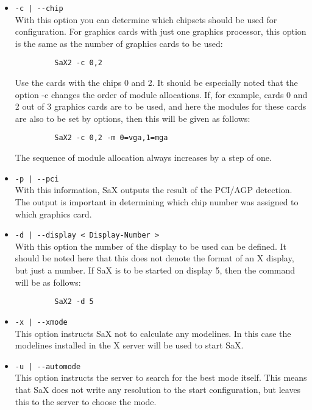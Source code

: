 \begin{itemize}
\item \verb+-c | --chip+\\
      With this option you can determine which chipsets should be used for
      configuration. For graphics cards with just one graphics processor,
      this option is the same as the number of graphics cards to be
      used:
      \begin{verbatim}
         SaX2 -c 0,2
      \end{verbatim}
      Use the cards with the chips 0 and 2. It should be especially noted that
      the option -c changes the order of module allocations. If, for example,
      cards 0 and 2 out of 3 graphics cards are to be used, and here the
      modules for these cards are also to be set by options, then this will be
      given as follows: 
      \begin{verbatim} 
         SaX2 -c 0,2 -m 0=vga,1=mga
      \end{verbatim}
      The sequence of module allocation always increases by a step of one.

\item \verb+-p | --pci+\\
      With this information, SaX outputs the result of the PCI/AGP detection. 
      The output is important in determining which chip number was assigned to
      which graphics card.

\item \verb+-d | --display < Display-Number >+\\
      With this option the number of the display to be used can be defined. It
      should be noted here that this does not denote the format of an X
      display, but just a number. If SaX is to be started on display 5, then
      the command will be as follows:
      \begin{verbatim} 
         SaX2 -d 5
      \end{verbatim} 
      
\item \verb+-x | --xmode+\\
      This option instructs SaX not to calculate any modelines. In 
      this case the modelines installed in the X server will be used to start
      SaX.

\item \verb+-u | --automode+\\
      This option instructs the server to search for the best mode
      itself. This means that SaX does not write any resolution to the start
      configuration, but leaves this to the server to choose the mode.


\end{itemize}
